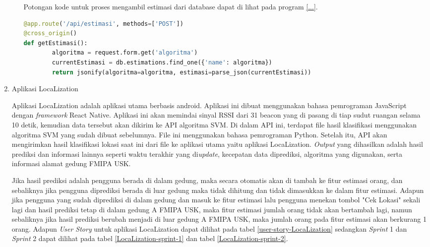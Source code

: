 \begin{enumerate}[1.]
\begin{enumerate}[a.]
		            Potongan kode untuk proses mengambil estimasi dari database dapat di lihat pada program \ref{...}.
		            \begin{lstlisting}[language=Python]
@app.route('/api/estimasi', methods=['POST'])
@cross_origin()
def getEstimasi():
		algoritma = request.form.get('algoritma')
		currentEstimasi = db.estimations.find_one({'name': algoritma})
		return jsonify(algoritma=algoritma, estimasi=parse_json(currentEstimasi))		\end{lstlisting}
	      \end{enumerate}
	\item Aplikasi LocaLization
	      \par Aplikasi LocaLization adalah aplikasi utama berbasis android. Aplikasi ini dibuat menggunakan bahasa pemrograman JavaScript dengan \textit{framework} React Native. Aplikasi ini akan memindai sinyal RSSI dari 31 beacon yang di pasang di tiap sudut ruangan selama 10 detik, kemudian data tersebut akan dikirim ke API algoritma SVM. Di dalam API ini, terdapat file hasil klasifikasi menggunakan algoritma SVM yang sudah dibuat sebelumnya. File ini menggunakan bahasa pemrograman Python. Setelah itu, API akan mengirimkan hasil klasifikasi lokasi saat ini dari file ke aplikasi utama yaitu aplikasi LocaLization. \textit{Output} yang dihasilkan adalah hasil prediksi dan informasi lainnya seperti waktu terakhir yang di\textit{update}, kecepatan data diprediksi, algoritma yang digunakan, serta informasi alamat gedung FMIPA USK.
	      \par Jika hasil prediksi adalah pengguna berada di dalam gedung, maka secara otomatis akan di tambah ke fitur estimasi orang, dan sebaliknya jika pengguna diprediksi berada di luar gedung maka tidak dihitung dan tidak dimasukkan ke dalam fitur estimasi. Adapun jika pengguna yang sudah diprediksi di dalam gedung dan masuk ke fitur estimasi lalu pengguna menekan tombol "Cek Lokasi" sekali lagi dan hasil prediksi tetap di dalam gedung A FMIPA USK, maka fitur estimasi jumlah orang tidak akan bertambah lagi, namun sebaliknya jika hasil prediksi berubah menjadi di luar gedung A FMIPA USK, maka jumlah orang pada fitur estimasi akan berkurang 1 orang. Adapun \textit{User Story} untuk aplikasi LocaLization dapat dilihat pada tabel \ref{user-story-LocaLization} sedangkan \textit{Sprint} 1 dan \textit{Sprint} 2 dapat dilihat pada tabel \ref{LocaLization-sprint-1} dan tabel \ref{LocaLization-sprint-2}.


\end{enumerate}
